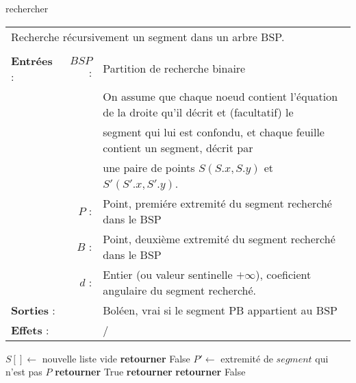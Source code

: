 \documentclass[10pt]{article}
\begin{document}
\begin{algorithm}[!h]
\caption{rechercher}
\begin{tabular}{lrl}
\multicolumn{3}{l}{Recherche récursivement un segment dans un arbre BSP.}\\
&&\\
\textbf{Entrées} : &$BSP$ : &Partition de recherche binaire\\
& &On assume que chaque noeud contient l'équation de la droite qu'il décrit et (facultatif) le\\ 
& &segment qui lui est confondu, et chaque feuille contient un segment, décrit par\\
& &une paire de points $S(S.x,S.y)$ et $S'(S'.x,S'.y)$.\\ 
& $P$ : &Point, premiére extremité du segment recherché dans le BSP\\
& $B$ : &Point, deuxième extremité du segment recherché dans le BSP\\
& $d$ : &Entier (ou valeur sentinelle $+\infty$), coeficient angulaire du segment recherché.\\
\textbf{Sorties} :& &Boléen, vrai si le segment PB appartient au BSP\\
\textbf{Effets} :& &/
\end{tabular}
\begin{algorithmic}[1]
\State $S[ ] \gets$ nouvelle liste vide
\State {}
\State {}
\State \textbf{retourner} False
\Else 
{}
\State $P'\gets$ extremité de $segment$ qui n'est pas $P$
\State \textbf{retourner} True
\Else
{}
\State \textbf{retourner} 
\EndIf
\EndIf
\EndFor
\EndIf
\State \textbf{retourner} False
\EndProcedure
\end{algorithmic}
\end{algorithm}
\newpage
\end{document}
